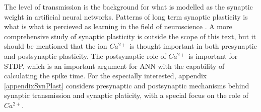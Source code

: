 The level of transmission is the background for what is modelled as the synaptic weight in artificial neural networks.
Patterns of long term synaptic plasticity is what is what is percieved as learning in the field of neuroscience \cite{NeuroscienceExploringTheBrain3edKAP25}.
A more comprehensive study of synaptic plasticity is outside the scope of this text, but it should be mentioned that the ion $Ca^{2+}$ is thought important in both presynaptic and postsynaptic plasticity.
The postsynaptic role of $Ca^{2+}$ is important for STDP, which is an important argument for ANN with the capability of calculating the spike time.
For the especially interested, appendix \ref{appendixSynPlast} considers presynaptic and postsynaptic mechanisms behind synaptic transmission and synaptic platicity, with a special focus on the role of $Ca^{2+}$.























